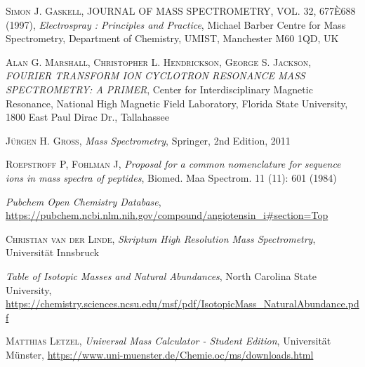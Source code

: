 \documentclass[a4paper,10pt]{article}
\begin{document}
\newpage

\begin{thebibliography}{99}
\textsc{Simon J. Gaskell}, JOURNAL OF MASS SPECTROMETRY, VOL. 32, 677È688 (1997), \textit{Electrospray : Principles and Practice}, Michael Barber Centre for Mass Spectrometry, Department of Chemistry, UMIST, Manchester M60 1QD, UK

\textsc{Alan G. Marshall, Christopher L. Hendrickson, George S. Jackson}, \textit{FOURIER TRANSFORM ION CYCLOTRON RESONANCE MASS SPECTROMETRY: A PRIMER}, Center for Interdisciplinary Magnetic Resonance, National High Magnetic Field Laboratory, Florida State University, 1800 East Paul Dirac Dr., Tallahassee

\textsc{Jürgen H. Gross}, \textit{Mass Spectrometry}, Springer, 2nd Edition, 2011

\textsc{Roepstroff P, Fohlman J}, \textit{Proposal for a common nomenclature for sequence ions in mass spectra of peptides}, Biomed. Maa Spectrom. 11 (11): 601 (1984)

\textit{Pubchem Open Chemistry Database}, \url{https://pubchem.ncbi.nlm.nih.gov/compound/angiotensin_i#section=Top}

\textsc{Christian van der Linde}, \textit{Skriptum High Resolution Mass Spectrometry}, Universität Innsbruck

\textit{Table of Isotopic Masses and Natural Abundances}, North Carolina State University, \url{https://chemistry.sciences.ncsu.edu/msf/pdf/IsotopicMass_NaturalAbundance.pdf}

\textsc{Matthias Letzel}, \textit{Universal Mass Calculator - Student Edition}, Universität Münster, \url{https://www.uni-muenster.de/Chemie.oc/ms/downloads.html}

\end{thebibliography}
\end{document}
